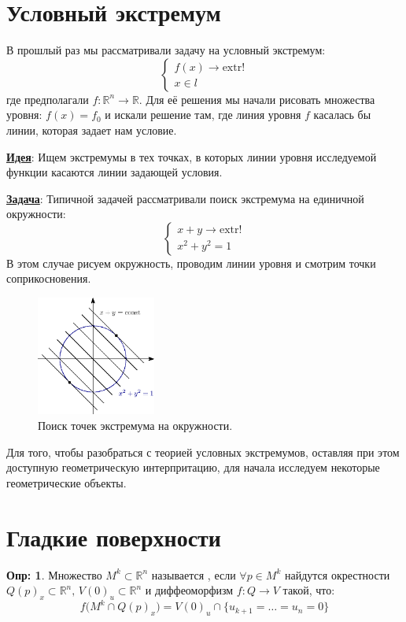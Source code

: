 \documentclass[12pt]{article}
\newcommand{\RN}[1]{%
	\textup{\uppercase\expandafter{\romannumeral#1}}%
}
\newcommand{\MR}{\mathbb{R}}
\theoremstyle{definition}
\newtheorem{defn}{Опр:}
\begin{document}
\lhead{Математический анализ - \RN{2}}
\section*{Условный экстремум}
В прошлый раз мы рассматривали задачу на условный экстремум:
$$
	\left\{
	\begin{array}{l}
		f(x) \to \text{extr}!\\
		x \in l
	\end{array}
	\right.
$$
где предполагали $f \colon \MR^n \to \MR$. Для её решения мы начали рисовать множества уровня: $f(x) = f_0$ и искали решение там, где линия уровня $f$ касалась бы линии, которая задает нам условие.

\textbf{\uline{Идея}}: Ищем экстремумы в тех точках, в которых линии уровня исследуемой функции касаются линии задающей условия.

\textbf{\uline{Задача}}: Типичной задачей рассматривали поиск экстремума на единичной окружности:
$$
	\left\{
	\begin{array}{l}
		x + y \to \text{extr}!\\
		x^2 + y^2  = 1
	\end{array}
	\right.
$$
В этом случае рисуем окружность, проводим линии уровня и смотрим точки соприкосновения.
\begin{figure}[H]
	\centering
	\includegraphics[width=0.35\textwidth]{19_1.eps}
	\caption{Поиск точек экстремума на окружности.}
	\label{19_1}
\end{figure}
Для того, чтобы разобраться с теорией условных экстремумов, оставляя при этом доступную геометрическую интерпритацию, для начала исследуем некоторые геометрические объекты.

\newpage
\section*{Гладкие поверхности}
\begin{defn}
	Множество $M^k \subset \MR^n$ называется , если $\forall p \in M^k$ найдутся окрестности $Q(p)_x \subset \MR^n, \, V(0)_u \subset \MR^n$ и диффеоморфизм $f \colon Q \to V$ такой, что:
	$$
		f\big(M^k \cap Q(p)_x\big) = V(0)_u \cap \{u_{k+1} = \dotsc = u_n = 0\}
	$$
\end{defn}
\end{document}
